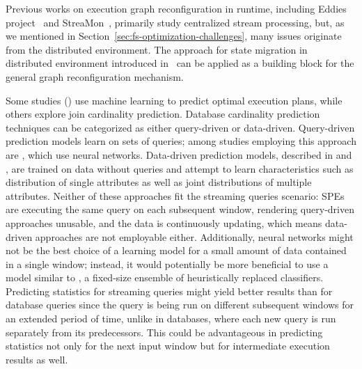 Previous works on execution graph reconfiguration in runtime, including Eddies project~\cite{10.1145/335191.335420} and StreaMon~\cite{10.1145/1007568.1007702}, primarily study centralized stream processing, but, as we mentioned in Section~\ref{sec:fs-optimization-challenges}, many issues originate from the distributed environment. The approach for state migration in distributed environment introduced in~\cite{10.14778/3329772.3329777} can be applied as a building block for the general graph reconfiguration mechanism.

Some studies (\cite{krishnan2018learning, marcus2019neo}) use machine learning to predict optimal execution plans, while others explore join cardinality prediction. Database cardinality prediction techniques can be categorized as either query-driven or data-driven. Query-driven prediction models learn on sets of queries; among studies employing this approach are \cite{liu2015cardinality, CHEN20211047, kipf2018learned, ortiz2019empirical}, which use neural networks. Data-driven prediction models, described in \cite{hilprecht2020deepdb} and \cite{yang2020neurocard}, are trained on data without queries and attempt to learn characteristics such as distribution of single attributes as well as joint distributions of multiple attributes. Neither of these approaches fit the streaming queries scenario: SPEs are executing the same query on each subsequent window, rendering query-driven approaches unusable, and the data is continuously updating, which means data-driven approaches are not employable either. Additionally, neural networks might not be the best choice of a learning model for a small amount of data contained in a single window; instead, it would potentially be more beneficial to use a model similar to \cite{street2001ensemble}, a fixed-size ensemble of heuristically replaced classifiers. Predicting statistics for streaming queries might yield better results than for database queries since the query is being run on different subsequent windows for an extended period of time, unlike in databases, where each new query is run separately from its predecessors. This could be advantageous in predicting statistics not only for the next input window but for intermediate execution results as well.




